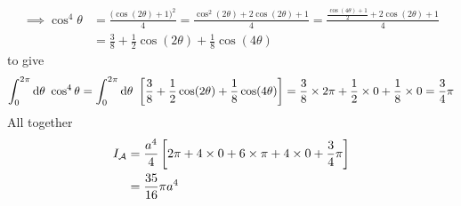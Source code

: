 \begin{eg}[Cardioid]
\begin{align*}
\implies \cos^4\theta &= \frac{\big(\cos(2\theta)+1\big)^2}{4}
    =\frac{\cos^2(2\theta)+2\cos(2\theta)+1}{4}
    =\frac{\frac{\cos(4\theta)+1}{2}+2\cos(2\theta)+1}{4} \\
   &=\frac{3}{8} +\frac{1}{2}\cos(2\theta) +\frac{1}{8}\cos(4\theta)
\end{align*}
to give
\begin{align*}
\int_0^{2\pi}\mathrm{d}\theta\ \cos^4\theta
=\int_0^{2\pi}\mathrm{d}\theta\ \left[\frac{3}{8} 
         +\frac{1}{2}\cos(2\theta) +\frac{1}{8}\cos(4\theta)\right]
=\frac{3}{8} \times 2\pi +\frac{1}{2}\times 0 +\frac{1}{8}\times 0
=\frac{3}{4}\pi
\end{align*}
All together
\begin{align*}
I_{\mathcal{A}}&= \frac{a^4}{4}\left[2\pi + 4\times 0 +6\times\pi+4\times 0
                        +\frac{3}{4}\pi\right] \\
   &=\frac{35}{16}\pi a^4
\end{align*}

\end{eg}

